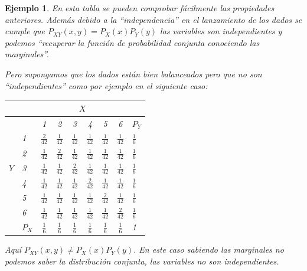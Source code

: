 \documentclass[12pt]{report}
\newtheorem{example}[definition]{Ejemplo}
\begin{document}
\begin{example}
            En esta tabla se pueden comprobar fácilmente las propiedades
            anteriores. Además debido a la ``independencia'' en el lanzamiento
            de los dados se cumple que $P_{XY}(x,y)=P_{X}(x) P_{Y}(y)$ las variables son independientes
            y podemos ``recuperar la función de probabilidad conjunta
            conociendo las marginales''.

            Pero supongamos que los dados están bien ba\-lan\-cea\-dos pero que no
            son ``independientes''  como por ejemplo en el siguiente caso:

            \begin{center}        \begin{tabular}{l|l|cccccc|l}
        &\multicolumn{1}{c}{}   & \multicolumn{6}{|c|}{$X$} & \\\hline
        &    & 1 & 2 & 3 & 4 & 5 & 6 & $P_{Y}$\\\hline
            & 1 & $\frac{2}{42}$ & $\frac{1}{42}$ & $\frac{1}{42}$ & $\frac{1}{42}$ &
            $\frac{1}{42}$ & $\frac{1}{42}$ & $\frac{1}{6}$\\
            &   2 & $\frac{1}{42}$ & $\frac{2}{42}$ & $\frac{1}{42}$
                & $\frac{1}{42}$ &
            $\frac{1}{42}$ & $\frac{1}{42}$ & $\frac{1}{6}$\\
        $Y$ &   3 & $\frac{1}{42}$ & $\frac{1}{42}$ & $\frac{2}{42}$
                & $\frac{1}{42}$ &
            $\frac{1}{42}$ & $\frac{1}{42}$ & $\frac{1}{6}$\\
            &   4 & $\frac{1}{42}$ & $\frac{1}{42}$ & $\frac{1}{42}$
                & $\frac{2}{42}$ &
            $\frac{1}{42}$ & $\frac{1}{42}$ & $\frac{1}{6}$\\
            &   5 & $\frac{1}{42}$ & $\frac{1}{42}$ & $\frac{1}{42}$
                & $\frac{1}{42}$ &
            $\frac{2}{42}$ & $\frac{1}{42}$ & $\frac{1}{6}$\\
            &   6 & $\frac{1}{42}$ & $\frac{1}{42}$ & $\frac{1}{42}$
                & $\frac{1}{42}$ &
        $\frac{1}{42}$ & $\frac{2}{42}$ & $\frac{1}{6}$\\\hline
        &   $P_{X}$ & $\frac{1}{6}$& $\frac{1}{6}$& $\frac{1}{6}$&
            $\frac{1}{6}$&
            $\frac{1}{6}$& $\frac{1}{6}$ & 1
            \end{tabular}
\end{center}

            Aquí $P_{XY}(x,y)\not= P_{X}(x) P_{Y}(y)$.
            En este caso sabiendo las marginales no podemos
            saber la
            distribución conjunta, las variables no son independientes.

        \end{example}
\end{document}
